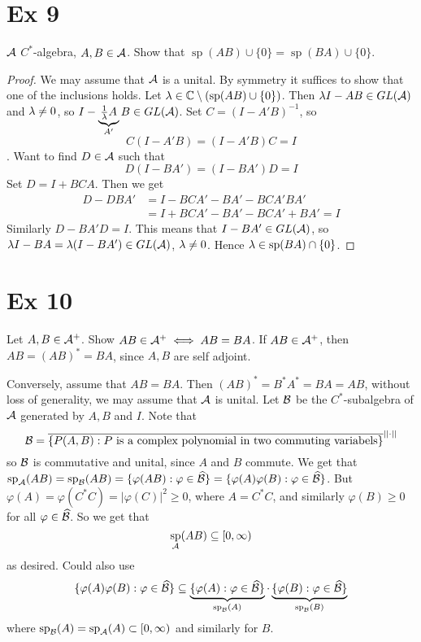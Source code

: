 \documentclass[10pt,english,a4paper]{article}
\theoremstyle{definition}
\DeclareMathOperator{\Sp}{sp}
\begin{document}
\section*{Ex 9}
$\mathcal{A}$ $C^*$-algebra, $A, B \in \mathcal{A}$. Show that $\Sp(AB) \cup \{0\} =
\Sp(BA)\cup \{0\}$.
\begin{proof}
    We may assume that $\mathcal{A}$ is a unital.
    By symmetry it suffices to show that one of the inclusions holds. 
    Let $\la \in \C \setminus (\Sp(AB)\cup \{0\})$. 
    Then $\lambda I -AB \in GL(\mathcal{A})$ and $\lambda \neq 0$, so
    $I-\underbrace{\tfrac{1}{\lambda}A}_{A'}B \in GL(\mathcal{A})$.  Set $C = (I-A'B)^{-1}$, so
    \[C(I-A'B) = (I-A'B)C = I\]. Want to find $D \in \mathcal{A}$ such that 
    \[D(I-BA') = (I-BA')D = I\]
    Set $D = I+BCA$. Then we get 
    \begin{align*}
        D-DBA' &= I-BCA' -BA' -BCA'BA' \\
        &= I+BCA' - BA' -BCA' +BA' = I
    \end{align*}
    Similarly $D-BA'D = I$. This means that $I-BA' \in GL(\mathcal{A})$, so
    $\lambda I - BA = \lambda(I-BA') \in GL(\mathcal{A})$, $\lambda  \neq 0$.
    Hence $\la \in \Sp(BA)\cap \{0\}$. 
     
\end{proof}

\section*{Ex 10}
Let $A,B \in \mathcal{A}^+$. Show $AB \in \mathcal{A}^+ \iff AB =BA$. If $AB \in \mathcal{A}^+$, 
then $AB = (AB)^* = BA$, since $A,B$ are self adjoint. 

Conversely, assume that $AB = BA$. Then $(AB)^* = B^*A^* = BA =AB$,
without loss of generality, we may assume that $\mathcal{A}$ is unital. 
Let $\mathcal{B}$ be the $C^*$-subalgebra of $\mathcal{A}$ generated by $A,B$ and $I$.
Note that 
\[
\mathcal{B} = \overline{\{ P(A,B) : P \text{ is a complex polynomial in two commuting variabels}\}}^{||\cdot||}
\]
so $\mathcal{B}$ is commutative and unital, since $A$ and $B$ commute.
We get that 
$\Sp_{\As}(AB) = \Sp_{\Bs}(AB) = \{\varphi(AB) : \varphi \in \widehat{\Bs}\}
= \{ \varphi(A)\varphi(B) : \varphi \in \widehat{\Bs} \}$. 
But $\varphi(A) = \varphi(C^*C) = |\varphi(C)|^2 \geq 0$, where $A = C^*C$, 
and similarly $\varphi(B) \geq 0$ for all $\varphi \in \widehat{\mathcal{B}}$.
So we get that 
\[ \Sp_{\As}(AB) \subseteq [0,\infty) \]
as desired. 
Could also use 
\begin{align*}
   \{ \varphi(A)\varphi(B) :\varphi \in \widehat{\Bs} \} 
    &\subseteq \ub{\{ \varphi(A) :\varphi \in \widehat{\Bs} \}}_{\Sp_{\Bs}(A)} \cdot
    \ub{\{ \varphi(B) :\varphi \in \widehat{\Bs} \}}_{\Sp_{\Bs}(B)}  \\
\end{align*}
where $\Sp_{\Bs}(A) = \Sp_{\As}(A) \subset [0,\infty)$ and similarly for $B$.
\end{document}
